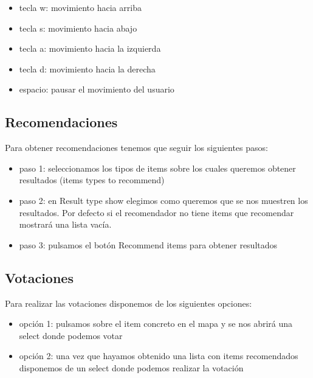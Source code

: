 \begin{itemize}
	\item tecla w: movimiento hacia arriba
	\item tecla s: movimiento hacia abajo
	\item tecla a: movimiento hacia la izquierda
	\item tecla d: movimiento hacia la derecha
	\item espacio: pausar el movimiento del usuario
\end{itemize}

\subsection{Recomendaciones}

Para obtener recomendaciones tenemos que seguir los siguientes pasos:

\begin{itemize}
	\item paso 1: seleccionamos los tipos de items sobre los cuales queremos obtener resultados (items types to recommend)
	\item paso 2: en Result type show elegimos como queremos que se nos muestren los resultados. Por defecto si el recomendador no tiene items que recomendar mostrará una lista vacía.
	\item paso 3: pulsamos el botón Recommend items para obtener resultados
\end{itemize}

\subsection{Votaciones}

Para realizar las votaciones disponemos de los siguientes opciones:

\begin{itemize}
	\item opción 1: pulsamos sobre el item concreto en el mapa y se nos abrirá una select donde podemos votar
	\item opción 2: una vez que hayamos obtenido una lista con items recomendados disponemos de un select donde podemos realizar la votación
\end{itemize}

